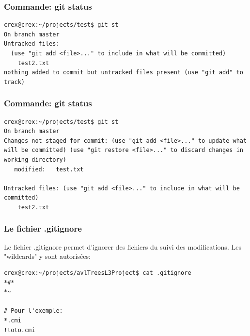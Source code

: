 \documentclass{beamer}
\begin{document}
\begin{frame}[fragile]
\frametitle{Commande: git status}

    \begin{mdframed}[style=Bash]
    \begin{lstlisting}[style=Bash, caption={git status après commit}]
crex@crex:~/projects/test$ git st
On branch master
Untracked files:
  (use "git add <file>..." to include in what will be committed)
	test2.txt
nothing added to commit but untracked files present (use "git add" to track)
    \end{lstlisting}
    \end{mdframed}

\end{frame}


\begin{frame}[fragile]
\frametitle{Commande: git status}

    \begin{mdframed}[style=Bash]
    \begin{lstlisting}[style=Bash, caption={git status modification de test.txt}]
crex@crex:~/projects/test$ git st
On branch master
Changes not staged for commit: (use "git add <file>..." to update what will be committed) (use "git restore <file>..." to discard changes in working directory)
   modified:   test.txt

Untracked files: (use "git add <file>..." to include in what will be committed)
	test2.txt
    \end{lstlisting}
    \end{mdframed}

\end{frame}

\begin{frame}[fragile]
\frametitle{Le fichier .gitignore}
Le fichier .gitignore permet d'ignorer des fichiers du suivi des modifications. Les "wildcards" y sont autorisées:
\medskip
\begin{mdframed}[style=Bash]
    \begin{lstlisting}[style=Bash, caption={Contenu du dossier .git/}]
crex@crex:~/projects/avlTreesL3Project$ cat .gitignore 
*#*
*~

# Pour l'exemple:
*.cmi
!toto.cmi
    \end{lstlisting}
    \end{mdframed}
\end{frame}
\end{document}
